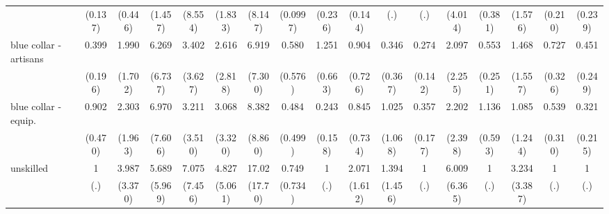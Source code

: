 {\begin{tabular}{l*{16}{c}}
                    &     (0.137)         &     (0.446)         &     (1.457)         &     (8.554)         &     (1.833)         &     (8.147)         &    (0.0997)         &     (0.236)         &     (0.144)         &         (.)         &         (.)         &     (4.014)         &     (0.381)         &     (1.576)         &     (0.210)         &     (0.239)         \\
[1em]
blue collar - artisans&       0.399         &       1.990         &       6.269         &       3.402         &       2.616         &       6.919         &       0.580         &       1.251         &       0.904         &       0.346         &       0.274\sym{*}  &       2.097         &       0.553         &       1.468         &       0.727         &       0.451         \\
                    &     (0.196)         &     (1.702)         &     (6.737)         &     (3.627)         &     (2.818)         &     (7.300)         &     (0.576)         &     (0.663)         &     (0.726)         &     (0.367)         &     (0.142)         &     (2.255)         &     (0.251)         &     (1.557)         &     (0.326)         &     (0.249)         \\
[1em]
blue collar - equip.&       0.902         &       2.303         &       6.970         &       3.211         &       3.068         &       8.382\sym{*}  &       0.484         &       0.243\sym{*}  &       0.845         &       1.025         &       0.357\sym{*}  &       2.202         &       1.136         &       1.085         &       0.539         &       0.321         \\
                    &     (0.470)         &     (1.963)         &     (7.606)         &     (3.510)         &     (3.320)         &     (8.860)         &     (0.499)         &     (0.158)         &     (0.734)         &     (1.068)         &     (0.177)         &     (2.398)         &     (0.593)         &     (1.244)         &     (0.310)         &     (0.215)         \\
[1em]
unskilled           &           1         &       3.987         &       5.689         &       7.075         &       4.827         &       17.02\sym{**} &       0.749         &           1         &       2.071         &       1.394         &           1         &       6.009         &           1         &       3.234         &           1         &           1         \\
                    &         (.)         &     (3.370)         &     (5.969)         &     (7.456)         &     (5.061)         &     (17.70)         &     (0.734)         &         (.)         &     (1.612)         &     (1.456)         &         (.)         &     (6.365)         &         (.)         &     (3.387)         &         (.)         &         (.)         \\

\end{tabular}}

